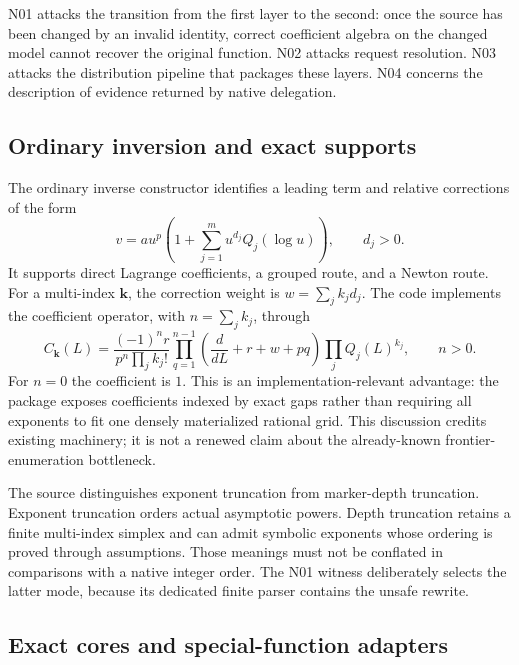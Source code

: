 \documentclass[11pt,a4paper]{article}
\begin{document}
N01 attacks the transition from the first layer to the second: once the source
has been changed by an invalid identity, correct coefficient algebra on the
changed model cannot recover the original function. N02 attacks request
resolution. N03 attacks the distribution pipeline that packages these layers.
N04 concerns the description of evidence returned by native delegation.

\subsection{Ordinary inversion and exact supports}

The ordinary inverse constructor identifies a leading term and relative
corrections of the form
\begin{equation}\label{eq:forwardmodel}
 v=a u^p\left(1+\sum_{j=1}^{m}u^{d_j}Q_j(\log u)\right),
 \qquad d_j>0.
\end{equation}
It supports direct Lagrange coefficients, a grouped route, and a Newton route.
For a multi-index $\mathbf{k}$, the correction weight is
$w=\sum_j k_jd_j$. The code implements the coefficient operator, with
$n=\sum_j k_j$, through
\begin{equation}\label{eq:lagrange}
 C_{\mathbf{k}}(L)=
 \frac{(-1)^n r}{p^n\prod_j k_j!}
 \prod_{q=1}^{n-1}\left(\frac{d}{dL}+r+w+pq\right)
 \prod_j Q_j(L)^{k_j}, \qquad n>0.
\end{equation}
For $n=0$ the coefficient is $1$. This is an implementation-relevant advantage:
the package exposes coefficients indexed by exact gaps rather than requiring
all exponents to fit one densely materialized rational grid. This discussion
credits existing machinery; it is not a renewed claim about the already-known
frontier-enumeration bottleneck.\cite{core}

The source distinguishes exponent truncation from marker-depth truncation.
Exponent truncation orders actual asymptotic powers. Depth truncation retains a
finite multi-index simplex and can admit symbolic exponents whose ordering is
proved through assumptions. Those meanings must not be conflated in comparisons
with a native integer order. The N01 witness deliberately selects the latter
mode, because its dedicated finite parser contains the unsafe rewrite.\cite{core}

\subsection{Exact cores and special-function adapters}
\end{document}
